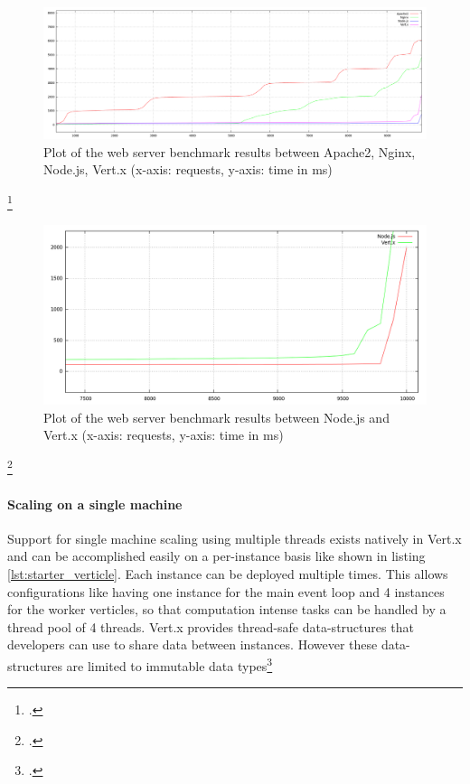 \begin{figure}[htbp]
\centering
\includegraphics[width=\textwidth]{img/200kb_benchmark.png}
\caption[Plot of the web server benchmark results (all servers)]{Plot of the web server benchmark results between Apache2, Nginx, Node.js, Vert.x (x-axis: requests, y-axis: time in ms)}
\label{fig:benchmark_all}
\end{figure}
\footcitetext{req_res}

\begin{figure}[htbp]
\centering
\includegraphics[width=\textwidth]{img/200kb_benchmark_node_vertx.png}
\caption[Plot of the web server benchmark results (asynchronous servers)]{Plot of the web server benchmark results between Node.js and Vert.x (x-axis: requests, y-axis: time in ms)}
\label{fig:benchmark_async}
\end{figure}
\footcitetext{req_res}


\paragraph{Scaling on a single machine}
Support for single machine scaling using multiple threads exists natively in
Vert.x and can be accomplished easily on a per-instance basis like shown in listing \ref{lst:starter_verticle}.
Each instance can
be deployed multiple times. This allows configurations like having one instance
for the main event loop and 4 instances for the worker verticles, so that
computation intense tasks can be handled by a thread pool of 4 threads. 
Vert.x provides  thread-safe data-structures that developers can use to share data between instances. However these data-structures are limited to immutable data types\footcite[Cf.][]{vertx_2012}\\

